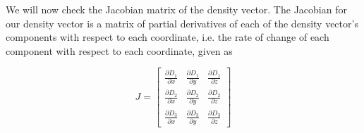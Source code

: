 We will now check the Jacobian matrix of the density vector.
The Jacobian for our density vector is a matrix of partial derivatives of each of the density vector's components with respect to each coordinate, i.e. the rate of change of each component with respect to each coordinate, given as

\begin{equation}
	J = \begin{bmatrix}
		\frac{\partial D_{1}}{\partial x} & \frac{\partial D_{1}}{\partial y} & \frac{\partial D_{1}}{\partial z} \\
		\frac{\partial D_{2}}{\partial x} & \frac{\partial D_{2}}{\partial y} & \frac{\partial D_{2}}{\partial z} \\
		\frac{\partial D_{3}}{\partial x} & \frac{\partial D_{3}}{\partial y} & \frac{\partial D_{3}}{\partial z}
	\end{bmatrix}
\end{equation}









